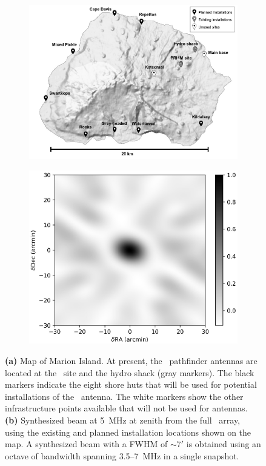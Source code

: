 \begin{figure}
	\centering
	\begin{subfigure}[t]{0.6\textwidth}
		\centering
		\includegraphics[width=\linewidth]{Figures/marion_map_annotated.jpg} 
		\caption{} \label{Fig:marion_map}
	\end{subfigure}
	\hfill
	\begin{subfigure}[t]{0.39\textwidth}
		\centering
		\includegraphics[width=\linewidth]{Figures/marion_beam_huts_2020.jpg}
		\caption{} \label{Fig:marion_beam}
	\end{subfigure}
	\caption{{\bf (a)} Map of Marion Island.  At present, the \albatros\ pathfinder antennas are located at the \prizm\ site and the hydro shack (gray markers). The black markers indicate the eight shore huts that will be used for potential installations of the \albatros\ antenna.  The white markers show the other infrastructure points available that will not be used for antennas. {\bf (b)} Synthesized beam at 5~MHz at zenith from the full \albatros\ array, using the existing and planned
		installation locations shown on the map.  A synthesized beam with a FWHM of $\sim7'$ is obtained using an octave of bandwidth spanning 3.5--7~MHz in a single snapshot.}
	\label{Fig:marion_map_beam}
\end{figure}

